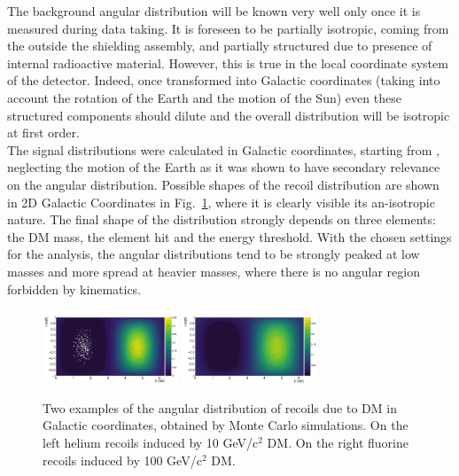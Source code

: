 \documentclass[physics,article,submit,moreauthors,pdftex]{Definitions/mdpi}
\begin{document}
 
 The background angular distribution will be known very well only once it is measured during data taking. It is foreseen to be partially isotropic, coming from the outside the shielding assembly, and partially structured due to presence of internal radioactive material. However, this is true in the local coordinate system of the detector. Indeed, once transformed into Galactic coordinates (taking into account the rotation of the Earth and the motion of the Sun) even these structured components should dilute and the overall distribution will be isotropic at first order.\\
The signal distributions were calculated in Galactic coordinates, starting from \cite{bib:LEWIN199687,bib:Gondolo_2002,bib:baxter2021recommended}, neglecting the motion of the Earth as it was shown to have secondary relevance on the angular distribution. Possible shapes of the recoil distribution are shown in 2D Galactic Coordinates in Fig.~\ref{fig:spectra2D}, where it is clearly visible its an-isotropic nature. The final shape of the distribution strongly depends on three elements: the DM mass, the element hit and the energy threshold. With the chosen settings for the analysis, the angular distributions tend to be strongly peaked at low masses and more spread at heavier masses, where there is no angular region forbidden by kinematics.
\begin{figure}[!th]
  \centering
\includegraphics[width=0.36\textwidth]{Heliumrecoil_10GeV.png}
\includegraphics[width=0.36\textwidth]{WIMP_F_100GeV.png}
\caption{Two examples of the angular distribution of recoils due to DM in Galactic coordinates, obtained by Monte Carlo simulations. On the left helium recoils induced by 10 GeV/c$^2$ DM. On the right fluorine recoils induced by 100 GeV/c$^2$ DM.}
 \label{fig:spectra2D}
\end{figure}
\end{document}
